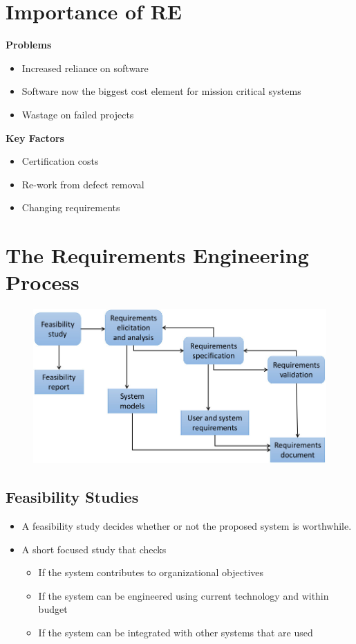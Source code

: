 \documentclass{report}
\begin{document}
\section{Importance of RE}
\textbf{Problems}
\begin{itemize}
  \item Increased reliance on software
  \item Software now the biggest cost element for mission critical systems
  \item Wastage on failed projects
\end{itemize}
\textbf{Key Factors}
\begin{itemize}
  \item Certification costs
  \item Re-work from defect removal
  \item Changing requirements
\end{itemize}

\section{The Requirements Engineering Process}
\begin{figure}[H]
\centering
\includegraphics[scale=.45,trim=1cm 1cm 1cm 1cm]{assets/CEN4010_RE_Process.jpg}
\end{figure}

\subsection{Feasibility Studies}
\begin{itemize}
  \item A feasibility study decides whether or not the proposed
system is worthwhile.
  \item A short focused study that checks
  \begin{itemize}
    \item If the system contributes to organizational objectives
    \item If the system can be engineered using current technology and within budget
    \item If the system can be integrated with other systems that are used
  \end{itemize}
\end{itemize}
\end{document}
